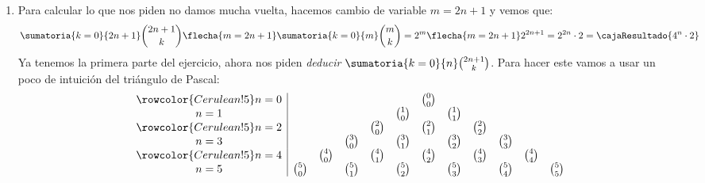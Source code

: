 \begin{enumerate}[label=\alph*)]
        El enunciado nos pedia deducir que: $\binom{2n}{n} < 4^n$.

        Este no tiene mucho misterio, expandimos el lado derecho con lo que probamos recién y nos queda:
        $$
          \binom{2n}{n} < \sumatoria{k = 0}{2n} \binom{2n}{k}
        $$
        $$
          \red{\binom{2n}{n}} < \binom{2n}{0} + \cdots + \red{\binom{2n}{n}} + \cdots \binom{2n}{2n}
        $$
        Bueno todos los términos de la derecha son positivos asi que se ve claramente que lo que nos planteaba el enunciado es verdadero.

  \item
        Para calcular lo que nos piden no damos mucha vuelta, hacemos cambio de variable $m = 2n + 1$ y vemos que:
        $$
          \sumatoria{k=0}{2n + 1} \binom{2n+1}{k}
          \flecha{m = 2n + 1}
          \sumatoria{k=0}{m} \binom{m}{k} = 2^m
          \flecha{m = 2n + 1}
          2^{2n + 1} = 2^{2n} \cdot 2 = \cajaResultado{4^n \cdot 2}
        $$
        Ya tenemos la primera parte del ejercicio, ahora nos piden \textit{deducir} $\sumatoria{k = 0}{n} \binom{2n + 1}{k}$.
        Para hacer este vamos a usar un poco de intuición del triángulo de Pascal:
        $$
          \begin{array}{c|ccccccccccc}
            \rowcolor{Cerulean!5}
            n=0 &              &              &              &              &              & \binom{0}{0} &              &              &              &              &              \\
            n=1 &              &              &              &              & \binom{1}{0} &              & \binom{1}{1} &              &              &              &              \\
            \rowcolor{Cerulean!5}
            n=2 &              &              &              & \binom{2}{0} &              & \binom{2}{1} &              & \binom{2}{2} &              &              &              \\
            n=3 &              &              & \binom{3}{0} &              & \binom{3}{1} &              & \binom{3}{2} &              & \binom{3}{3} &              &              \\
            \rowcolor{Cerulean!5}
            n=4 &              & \binom{4}{0} &              & \binom{4}{1} &              & \binom{4}{2} &              & \binom{4}{3} &              & \binom{4}{4} &              \\
            n=5 & \binom{5}{0} &              & \binom{5}{1} &              & \binom{5}{2} &              & \binom{5}{3} &              & \binom{5}{4} &              & \binom{5}{5}

\end{array}$$
\end{enumerate}
